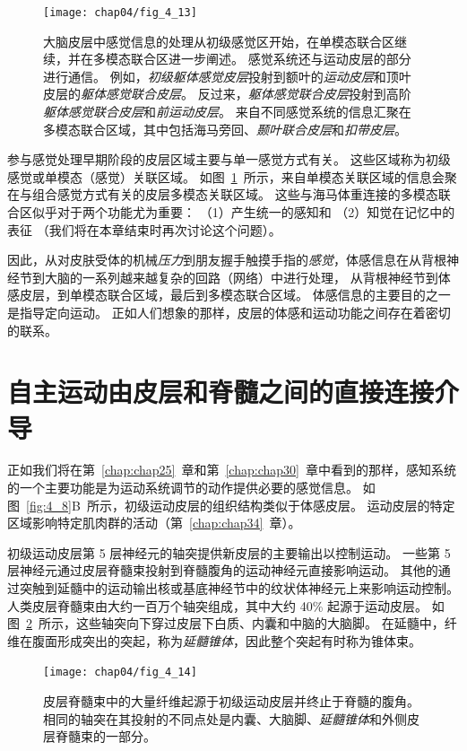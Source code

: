 \begin{figure}[htbp]
	\centering
	\texttt{[image: chap04/fig\_4\_13]}
	\caption{大脑皮层中感觉信息的处理从初级感觉区开始，在单模态联合区继续，并在多模态联合区进一步阐述。
		感觉系统还与运动皮层的部分进行通信。
		例如，\textit{初级躯体感觉皮层}投射到额叶的\textit{运动皮层}和顶叶皮层的\textit{躯体感觉联合皮层}。
		反过来，\textit{躯体感觉联合皮层}投射到高阶\textit{躯体感觉联合皮层}和\textit{前运动皮层}。
		来自不同感觉系统的信息汇聚在多模态联合区域，其中包括海马旁回、\textit{颞叶联合皮层}和\textit{扣带皮层}。}
	\label{fig:4_13}
\end{figure}


参与感觉处理早期阶段的皮层区域主要与单一感觉方式有关。
这些区域称为初级感觉或单模态（感觉）关联区域。
如图~\ref{fig:4_13}~所示，来自单模态关联区域的信息会聚在与组合感觉方式有关的皮层多模态关联区域。
这些与海马体重连接的多模态联合区似乎对于两个功能尤为重要：
（1）产生统一的感知和 
（2）知觉在记忆中的表征
（我们将在本章结束时再次讨论这个问题）。


因此，从对皮肤受体的机械\textit{压力}到朋友握手触摸手指的\textit{感觉}，体感信息在从背根神经节到大脑的一系列越来越复杂的回路（网络）中进行处理，
从背根神经节到体感皮层，到单模态联合区域，最后到多模态联合区域。
体感信息的主要目的之一是指导定向运动。
正如人们想象的那样，皮层的体感和运动功能之间存在着密切的联系。



\section{自主运动由皮层和脊髓之间的直接连接介导}

正如我们将在第~\ref{chap:chap25}~章和第~\ref{chap:chap30}~章中看到的那样，感知系统的一个主要功能是为运动系统调节的动作提供必要的感觉信息。 
如图~\ref{fig:4_8}B~所示，初级运动皮层的组织结构类似于体感皮层。 
运动皮层的特定区域影响特定肌肉群的活动（第~\ref{chap:chap34}~章）。


初级运动皮层第 5 层神经元的轴突提供新皮层的主要输出以控制运动。
一些第 5 层神经元通过皮层脊髓束投射到脊髓腹角的运动神经元直接影响运动。
其他的通过突触到延髓中的运动输出核或基底神经节中的纹状体神经元上来影响运动控制。
人类皮层脊髓束由大约一百万个轴突组成，其中大约 40\% 起源于运动皮层。
如图~\ref{fig:4_14}~所示，这些轴突向下穿过皮层下白质、内囊和中脑的大脑脚。
在延髓中，纤维在腹面形成突出的突起，称为\textit{延髓锥体}，因此整个突起有时称为锥体束。


\begin{figure}[htbp]
	\centering
	\texttt{[image: chap04/fig\_4\_14]}
	\caption{皮层脊髓束中的大量纤维起源于初级运动皮层并终止于脊髓的腹角。
		相同的轴突在其投射的不同点处是内囊、大脑脚、\textit{延髓锥体}和外侧皮层脊髓束的一部分。}
	\label{fig:4_14}
\end{figure}


